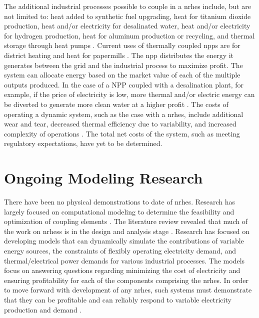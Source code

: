 The additional industrial processes possible to couple in a \ac{nrhes} include, but are not limited to: heat added to synthetic fuel upgrading, heat for titanium dioxide production, heat and/or electricity for desalinated water, heat and/or electricity for hydrogen production, heat for aluminum production or recycling, and thermal storage through heat pumps \cite{Bienvenue2015}.  Current uses of thermally coupled \ac{npps} are for district heating and heat for papermills \cite{Verfondern}. The \ac{npp} distributes the energy it generates between the grid and the industrial process to maximize profit. The system can allocate energy based on the market value of each of the multiple outputs produced. In the case of a NPP coupled with a desalination plant, for example, if the price of electricity is low, more thermal and/or electric energy can be diverted to generate more clean water at a higher profit \cite {Chen2016}. The costs of operating a dynamic system, such as the case with a \ac{nrhes}, include additional wear and tear, decreased thermal efficiency  due to variability, and increased complexity of operations  \cite{Garcia2013}. The total net costs of the system, such as meeting regulatory expectations, have yet to be determined.

\section{Ongoing Modeling Research}
There have been no physical demonstrations to date of \ac{nrhes}. Research has largely focused on computational modeling to determine the feasibility and optimization of coupling elements \cite{Rabiti2015, Shropshire2012}. The literature review revealed that much of the work on \ac{nrhess} is in the design and analysis stage \cite{Epiney2016, Shropshire2012}. Research has focused on developing models that can dynamically simulate the contributions of variable energy sources, the constraints of flexibly operating electricity demand, and thermal/electrical power demands for various industrial processes. The models focus on answering questions regarding minimizing the cost of electricity and ensuring profitability for each of the components comprising the \ac{nrhes}. In order to move forward with development of any \ac{nrhes}, such systems must demonstrate that they can be profitable and can reliably respond to variable electricity production and demand \cite{Rabiti2015}.


